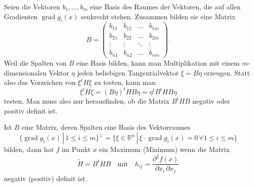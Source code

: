 Seien die Vektoren $b_1,\dots,b_m$ eine Basis des Raumes der Vektoren,
die auf allen Gradienten $\operatorname{grad}g_i(x)$ senkrecht stehen.
Zusammen bilden sie eine Matrix 
\[
B=\begin{pmatrix}
b_{11}&b_{12}&\dots &b_{1m}\\
b_{21}&b_{22}&\dots &b_{2m}\\
\vdots&\vdots&\ddots&\vdots\\
b_{n1}&b_{n2}&\dots &b_{nm}
\end{pmatrix}.
\]
Weil die Spalten von $B$ eine Basis bilden,
kann man Multiplikation mit einem $m$-dimensionalen Vektor $\eta$
jeden beliebigen Tangentialvektor $\xi=B\eta$ erzeugen. Statt also
das Vorzeichen von $\xi^tH\xi$ zu testen, kann man
\[
\xi^tH\xi=
(B\eta)^tHB\eta=\eta^tB^tHB\eta
\]
testen. Man muss also nur herausfinden, ob die Matrix $B^tHB$
negativ oder positiv definit ist.

\begin{satz}
\label{nlp:satz:nebenbedingungen-maximumkriterium}
Ist $B$ eine Matrix, deren Spalten eine Basis des Vektorraumes
\[
\{
\operatorname{grad}g_i(x)\,|\,1\le i\le m
\}^{\perp}
=
\{\xi\in\mathbb R^n\,|\, \xi\cdot\operatorname{grad}g_i(x)=0\,\forall 1\le i\le m
\}
\]
bilden, dann hat $f$ im Punkt $x$ ein Maximum (Minimum) wenn die Matrix
\[
\tilde H=B^tHB\quad\text{mit}\quad h_{ij}=\frac{\partial^2f(x)}{\partial x_i\,\partial x_j}
\]
negativ (positiv) definit ist.
\end{satz}


